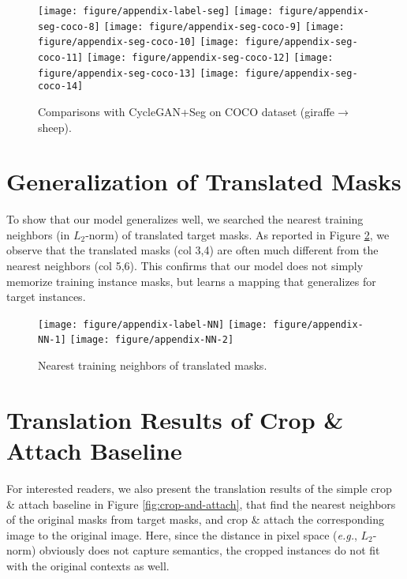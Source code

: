 \documentclass{article} \usepackage{iclr2019_conference,times}
\begin{document}
\begin{figure}[H]
	\centering
	\texttt{[image: figure/appendix-label-seg]}
	\texttt{[image: figure/appendix-seg-coco-8]}
    \texttt{[image: figure/appendix-seg-coco-9]}
    \texttt{[image: figure/appendix-seg-coco-10]}
    \texttt{[image: figure/appendix-seg-coco-11]}
    \texttt{[image: figure/appendix-seg-coco-12]}
    \texttt{[image: figure/appendix-seg-coco-13]}
    \texttt{[image: figure/appendix-seg-coco-14]}
	\caption{
	Comparisons with CycleGAN+Seg on COCO dataset (giraffe$\to$sheep).
	} \label{fig:more-cycleganseg-coco-2}
\end{figure}


\newpage
\section{Generalization of Translated Masks}
\label{sec:nearest-neighbor}

To show that our model generalizes well,
we searched the nearest training neighbors (in $L_2$-norm) of translated target masks.
As reported in Figure \ref{fig:nearest-neighbor}, we observe that the translated masks (col 3,4) are often much different from the nearest neighbors (col 5,6).
This confirms that our model does not simply memorize training instance masks, but learns a mapping that generalizes for target instances.

\begin{figure}[H]
	\centering
	\texttt{[image: figure/appendix-label-NN]}
	\texttt{[image: figure/appendix-NN-1]}
    \texttt{[image: figure/appendix-NN-2]}
	\caption{
	Nearest training neighbors of translated masks.
	} \label{fig:nearest-neighbor}
\end{figure}

\section{Translation Results of Crop \& Attach Baseline}

For interested readers, we also present the translation results of the simple crop \& attach baseline
in Figure \ref{fig:crop-and-attach},
that find the nearest neighbors of the original masks from target masks,
and crop \& attach the corresponding image to the original image.
Here, since the distance in pixel space (\textit{e.g.}, $L_2$-norm) obviously does not capture semantics,
the cropped instances do not fit with the original contexts as well.
\end{document}
